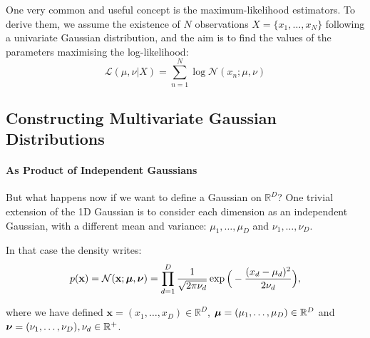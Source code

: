 
One very common and useful concept is the maximum-likelihood estimators. To derive them, we assume the existence of $N$ observations $X=\{x_1,\ldots,x_N\}$ following a univariate Gaussian distribution, and the aim is to find the values of the parameters maximising the log-likelihood:
\begin{equation}
\mathcal{L}(\mu,\nu|X) = \sum_{n=1}^N \log \mathcal{N}(x_n;\mu,\nu)
\end{equation}


\subsection{Constructing Multivariate Gaussian Distributions}

\paragraph{As Product of Independent Gaussians} But what happens now if we want to define a Gaussian on $\mathbb{R}^D$? One trivial extension of the 1D Gaussian is to consider each dimension as an independent Gaussian, with a different mean and variance: $\mu_1,\ldots,\mu_D$ and $\nu_1,\ldots,\nu_D$.
 
In that case the density writes:
\begin{equation}
p(\mathbf{x}) = \mathcal{N}(\mathbf{x};\boldsymbol{\mathbf{\mu}},\boldsymbol{\mathbf{\nu}}) = \prod_{d=1}^D\frac{1}{\sqrt{2\pi\nu_d}}\exp\Big(-\frac{(x_d-\mu_d)^2}{2\nu_d}\Big),
\end{equation}

where we have defined $\mathbf{x}=(x_1,\ldots,x_D)\in\mathbb{R}^D$, $\boldsymbol{\mathbf{\mu}}=(\mu_1,\ldots,\mu_D)\in\mathbb{R}^D$ and $\boldsymbol{\mathbf{\nu}}=(\nu_1,\ldots,\nu_D), \nu_d\in\mathbb{R}^{+}$.

